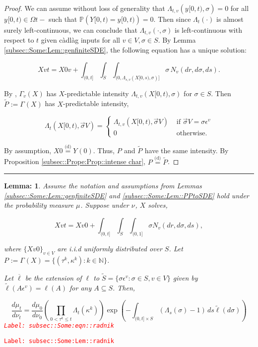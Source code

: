 \documentclass[12pt]{article}
\newcommand{\mb}{\mathbb}
\newcommand{\ov}{\overline}
\newcommand{\te}{\text}
\newcommand{\ep}{\epsilon}
\newcommand{\tr}{\textcolor{red}}
\newcommand{\labe}[1]{\tr{\texttt{Label: #1}}}
\newcommand{\ind}{\hspace{24pt}}
\newcommand{\lin}{\rule{\linewidth}{0.4 pt}}
\newcommand{\pr}{\mb{P}}							%
\newcommand{\deq}{\overset{\text{(d)}}{=}}			%
\newcommand{\defeq}{:=}								%
\renewcommand{\v}{v}							%
\renewcommand{\S}{S}							%
\newcommand{\s}{\sigma}							%
\newcommand{\sv}{\vec{\s}}						%
\newcommand{\ev}[1]{\ep^{#1}}					%
\renewcommand{\t}{t}							%
\renewcommand{\tt}{s}							%
\newcommand{\X}{X}								%
\newcommand{\poiss}[1]{N_{#1}}						%
\newcommand{\V}{V}									%
\renewcommand{\r}{r}								%
\newcommand{\rt}[1]{\tau^{#1}}						%
\renewcommand{\it}{k}								%
\newcommand{\XState}[1]{\S^{#1}}				%
\newcommand{\rxvtt}[2]{Y_{#1}{(#2)}}				%
\newcommand{\xvtts}[2]{y_{#1}{#2}}					%
\newcommand{\rxvtts}[2]{Y_{#1}{#2}}					%
\newcommand{\rp}[1]{P^{#1}}							%
\newcommand{\m}[3]{\mu_{#2#1}^{#3}}						%
\newcommand{\mm}[3]{\nu_{#2#1}^{#3}}						%
\newcommand{\ratee}[1]{\Lambda_{#1}}				%
\newcommand{\Sm}{\ell}								%
\newcommand{\alt}{\widetilde}						%
\newcommand{\typset}{A}							%
\renewcommand{\mark}[1]{\kappa^{#1}}				%
\newcommand{\pmap}[1]{\Gamma_{#1}}				%
\newtheorem{lem}[thms]{Lemma: }
\begin{document}
\begin{proof}

We can assume without loss of generality that \(\ratee{\t,\v}(\xvtts{}{[0,\t)},\s) = 0\) for all \(\xvtts{}{[0,\t)}\in \Omega{}{\t-}\) such that \(\pr(\rxvtts{}{[0,\t)} = \xvtts{}{[0,\t)}) = 0\). Then since \(\ratee{\t}(\cdot)\) is almost surely left-continuous, we can conclude that \(\ratee{\t,\v}(\cdot,\s)\) is left-continuous with respect to \(\t\) given c\`adl\`ag inputs for all \(\v\in \V,\s\in\S\). By Lemma \ref{subsec::Some:Lem::genfiniteSDE}, the following equation has a unique solution:

\[\X{\v}{\t} = \X{0}{\v} + \int_{(0,\t]}\int_\S\int_{(0,\ratee{\tt,\v}(\X{}{[0,\tt)},\s)]}  \s\,\poiss{\v}(d\r,d\s,d\tt).\]

By \cite[Exercise 14.7.1]{DalVer08}, \(\pmap{\v}(\X{}{})\) has \(\X{}{}\)-predictable intensity \(\ratee{\t,\v}(\X{}{[0,\t)},\s)\) for \(\s \in \S\). Then \(\alt{\rp{}} \defeq \pmap{}(\X{}{})\) has \(\X{}{}\)-predictable intensity,

\[\ratee{\t}(\X{}{[0,\t)},\sv{}{\V}) = \begin{cases}
\ratee{\t,\v}(\X{}{[0,\t)},\sv{}{\V}) &\te{ if } \sv{}{\V} = \s\ev{\v}\\
0&\te{ otherwise.}
\end{cases}\]

By assumption, \(\X{}{0} \deq \rxvtt{}{0}\). Thus, \(\rp{}\) and \(\alt{\rp{}}\) have the same intensity. By Proposition \ref{subsec::Prope:Prop::intense char}, \(\rp{} \deq \alt{\rp{}}\).
\end{proof}
\lin

\begin{lem}
Assume the notation and assumptions from Lemmas \ref{subsec::Some:Lem::genfiniteSDE} and \ref{subsec::Some:Lem::PPtoSDE} hold under the probability measure \(\m{}{}{}\). Suppose under \(\mm{}{}{}\), \(\X{}{}\) solves,

\[\X{\v}{\t} = \X{\v}{0} +\int_{(0,\t]}\int_\S\int_{(0,1]} \s \poiss{\v}(d\r,d\s,d\tt),\]

where \(\{\X{\v}{0}\}_{\v \in \V}\) are i.i.d uniformly distributed over \(\S\). Let \(\rp{} \defeq \pmap{}(\X{}{}) = \{(\rt{\it},\mark{\it}):\it\in \mb{N}\}\).

\ind Let \(\ov{\ell}\) be the extension of \(\Sm\) to \(\alt{\S} = \{\s\ev{\v}: \s \in \S, \v \in \V\}\) given by \(\alt{\Sm}(\typset\ev{\v}) = \Sm(\typset)\) for any \(\typset \subseteq \S\). Then,

\begin{equation}
\frac{d\m{}{\t}{}}{d\mm{}{\t}{}}= \frac{d\m{}{0}{}}{d\mm{}{0}{}}\left(\prod_{0< \rt{\it}\leq t} \ratee{\t}(\mark{\it})\right)\exp\left(-\int_{(0,\t]\times \S} (\ratee{\tt}(\s) - 1)\,d\tt\alt{\Sm}(d\s)\right)
\label{subsec::Some:eqn::radnik}
\end{equation}
\labe{subsec::Some:eqn::radnik}
\label{subsec::Some:Lem::radnik}
\end{lem}
\labe{subsec::Some:Lem::radnik}
\end{document}
